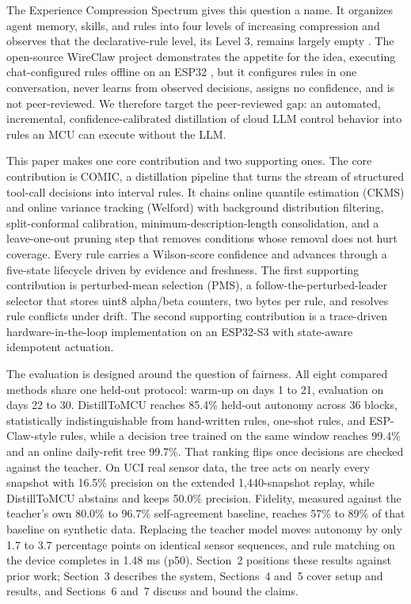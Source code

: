 \documentclass[11pt,a4paper]{article}
\begin{document}
The Experience Compression Spectrum gives this question a name. It organizes
agent memory, skills, and rules into four levels of increasing compression and
observes that the declarative-rule level, its Level 3, remains largely empty
\cite{11}. The open-source WireClaw project demonstrates the appetite for the
idea, executing chat-configured rules offline on an ESP32 \cite{12}, but it
configures rules in one conversation, never learns from observed decisions,
assigns no confidence, and is not peer-reviewed. We therefore target the
peer-reviewed gap: an automated, incremental, confidence-calibrated
distillation of cloud LLM control behavior into rules an MCU can execute
without the LLM.

This paper makes one core contribution and two supporting ones. The core
contribution is COMIC, a distillation pipeline that turns the stream of
structured tool-call decisions into interval rules. It chains online quantile
estimation (CKMS) and online variance tracking (Welford) with background
distribution filtering, split-conformal calibration,
minimum-description-length consolidation, and a leave-one-out pruning step
that removes conditions whose removal does not hurt coverage. Every rule
carries a Wilson-score confidence and advances through a five-state lifecycle
driven by evidence and freshness. The first supporting contribution is
perturbed-mean selection (PMS), a follow-the-perturbed-leader selector that
stores uint8 alpha/beta counters, two bytes per rule, and resolves rule
conflicts under drift. The second supporting contribution is a trace-driven
hardware-in-the-loop implementation on an ESP32-S3 with state-aware idempotent
actuation.

The evaluation is designed around the question of fairness. All eight compared
methods share one held-out protocol: warm-up on days 1 to 21, evaluation on
days 22 to 30. DistillToMCU reaches 85.4\% held-out autonomy across 36
blocks, statistically indistinguishable from hand-written rules, one-shot
rules, and ESP-Claw-style rules, while a decision tree trained on the same
window reaches 99.4\% and an online daily-refit tree 99.7\%. That ranking
flips once decisions are checked against the teacher. On UCI real sensor
data, the tree acts on nearly every snapshot with 16.5\% precision on the
extended 1,440-snapshot replay, while DistillToMCU abstains and keeps 50.0\%
precision. Fidelity, measured against the teacher's own 80.0\% to 96.7\%
self-agreement baseline, reaches 57\% to 89\% of that baseline on synthetic
data. Replacing the teacher model moves autonomy by only 1.7 to 3.7
percentage points on identical sensor sequences, and rule matching on the
device completes in 1.48 ms (p50). Section~2 positions these results against
prior work; Section~3 describes the system, Sections~4 and~5 cover setup and
results, and Sections~6 and~7 discuss and bound the claims.
\end{document}
